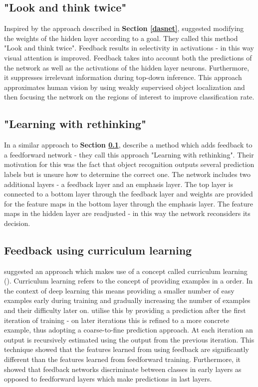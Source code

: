 \documentclass{l4proj}
\begin{document}
\subsection{"Look and think twice"}
\label{twice}
Inspired by the approach described in \textbf{Section \ref{dasnet}}, \cite{thinktwice} suggested modifying the weights of the hidden layer according to a goal. They called this method "Look and think twice". Feedback results in selectivity in activations - in this way visual attention is improved. Feedback takes into account both the predictions of the network as well as the activations of the hidden layer neurons.
Furthermore, it suppresses irrelevant information during top-down inference. This approach approximates human vision by using weakly supervised object localization and then focusing the network on the regions of interest to improve classification rate.

\subsection{"Learning with rethinking"}
In a similar approach to \textbf{Section \ref{twice}}, \cite{rethinking} describe a method which adds feedback to a feedforward network - they call this approach "Learning with rethinking". Their motivation for this was the fact that object recognition outputs several prediction labels but is unsure how to determine the correct one.
The network includes two additional layers - a feedback layer and an emphasis layer. The top layer is connected to a bottom layer through the feedback layer and weights are provided for the feature maps in the bottom layer through the emphasis layer. The feature maps in the hidden layer are readjusted - in this way the network reconsiders its decision.

\subsection{Feedback using curriculum learning}
\cite{feedbackcurriculum} suggested an approach which makes use of a concept called curriculum learning (\cite{curriculum}). Curriculum learning refers to the concept of providing examples in a order. In the context of deep learning this means providing a smaller number of easy examples early during training and gradually increasing the number of examples and their difficulty later on. \cite{feedbackcurriculum} utilise this by providing a prediction after the first iteration of training - on later iterations this is refined to a more concrete example, thus adopting a coarse-to-fine prediction approach. At each iteration an output is recursively estimated using the output from the previous iteration. This technique showed that the features learned from using feedback are significantly different than the features learned from feedforward training. Furthermore, it showed that feedback networks discriminate between classes in early layers as opposed to feedforward layers which make predictions in last layers.
\end{document}
